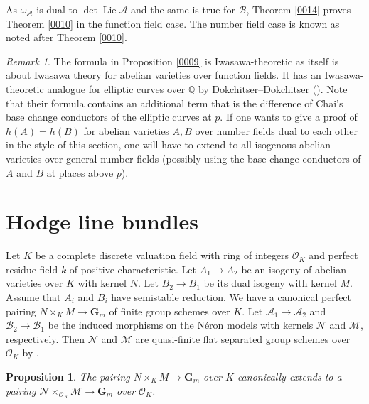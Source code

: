 \documentclass{amsart}
\newtheorem{proposition}[theorem]{Proposition}
\theoremstyle{remark}
\newtheorem{remark}[theorem]{Remark}
\numberwithin{equation}{section}
\newcommand{\Order}{\mathcal{O}}
\newcommand{\Q}{\mathbb{Q}}
\newcommand{\Gm}{\mathbf{G}_{m}}
\DeclareMathOperator{\Lie}{Lie}
\begin{document}
As $\omega_{\mathcal{A}}$ is dual to $\det \Lie \mathcal{A}$
and the same is true for $\mathcal{B}$,
Theorem \ref{0014} proves Theorem \ref{0010}
in the function field case.
The number field case is known
as noted after Theorem \ref{0010}.

\begin{remark}
	The formula in Proposition \ref{0009} is Iwasawa-theoretic
	as \cite{GRS24} itself is about
	Iwasawa theory for abelian varieties over function fields.
	It has an Iwasawa-theoretic analogue
	for elliptic curves over $\Q$
	by Dokchitser--Dokchitser (\cite[Theorem 1.1]{DD15}).
	Note that their formula contains an additional term
	that is the difference of Chai's base change conductors
	of the elliptic curves at $p$.
	If one wants to give a proof of $h(A) = h(B)$
	for abelian varieties $A, B$ over number fields dual to each other
	in the style of this section,
	one will have to extend \cite[Theorem 1.1]{DD15}
	to all isogenous abelian varieties over general number fields
	(possibly using the base change conductors
	of $A$ and $B$ at places above $p$).
\end{remark}


\section{Hodge line bundles}

Let $K$ be a complete discrete valuation field
with ring of integers $\Order_{K}$
and perfect residue field $k$ of positive characteristic.
Let $A_{1} \to A_{2}$ be an isogeny of abelian varieties over $K$
with kernel $N$.
Let $B_{2} \to B_{1}$ be its dual isogeny
with kernel $M$.
Assume that $A_{i}$ and $B_{i}$ have semistable reduction.
We have a canonical perfect pairing
$N \times_{K} M \to \Gm$
of finite group schemes over $K$.
Let $\mathcal{A}_{1} \to \mathcal{A}_{2}$
and $\mathcal{B}_{2} \to \mathcal{B}_{1}$ be
the induced morphisms on the N\'eron models
with kernels $\mathcal{N}$ and $\mathcal{M}$, respectively.
Then $\mathcal{N}$ and $\mathcal{M}$ are
quasi-finite flat separated group schemes over $\Order_{K}$
by \cite[Section 7.3, Lemma 5]{BLR90}.

\begin{proposition} \label{0000}
	The pairing
	$N \times_{K} M \to \Gm$
	over $K$ canonically extends to a pairing
	$\mathcal{N} \times_{\Order_{K}} \mathcal{M} \to \Gm$
	over $\Order_{K}$.
\end{proposition}
\end{document}
